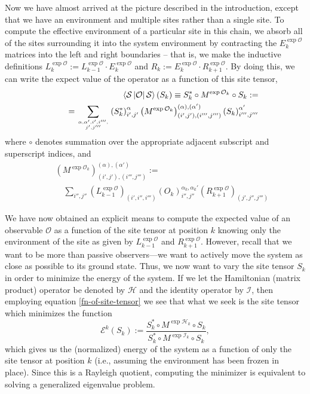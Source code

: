 \documentclass[12pt]{amsbook}
\theoremstyle{plain}
\theoremstyle{definition}
\theoremstyle{remark}
\newcommand{\coip}[3]{\left<#1\left|#2\right|#3\right>}
\newcommand{\paren}[1]{\left(#1\right)}
\newcommand{\mexp}[1]{\exp{\mathcal{#1}}}
\begin{document}
Now we have almost arrived at the picture described in the introduction, except that we have an environment and multiple sites rather than a single site.  To compute the effective environment of a particular site in this chain, we absorb all of the sites surrounding it into the system environment by contracting the $E_k^{\mexp{O}}$ matrices into the left and right boundaries -- that is, we make the inductive definitions $L_k^{\exp{\mathcal{O}}}:= L_{k-1}^{\exp{\mathcal{O}}}\cdot E_k^{\exp{\mathcal{O}}}$ and $R_k:=E_k^{\exp{\mathcal{O}}}\cdot R_{k+1}^{\exp{\mathcal{O}}}$.  By doing this, we can write the expect value of the operator as a function of this site tensor,  \begin{eqnarray}
\label{fn-of-site-tensor}
&&\coip{\mathcal{S}}{\mathcal{O}}{\mathcal{S}}(S_k) \equiv S_k^* \circ M^{\exp{\mathcal{O}}_k} \circ S_k :=  \\
&&\quad= \sum_{\genfrac{}{}{0pt}{}{\alpha,\alpha',i',i''',}{j',j'''}}\paren{S_k^*}^\alpha_{i',j'} \paren{M^{\exp{\mathcal{O}}_k}}^{(\alpha),(\alpha')}_{(i',j'),(i''',j''')}\paren{S_k}^{\alpha'}_{i''',j'''} \nonumber
\end{eqnarray}  where $\circ$ denotes summation over the appropriate adjacent subscript and superscript indices, and  \begin{eqnarray}
\label{m-matrix-definition}
&&\paren{M^{\exp{\mathcal{O}}_k}}^{(\alpha),(\alpha')}_{(i',j'),(i''',j''')} := \nonumber\\
&&\quad\sum_{i'',j''}\paren{L_{k-1}^{\exp{\mathcal{O}}}}_{(i',i'',i''')} \paren{O_k}^{\alpha_k,\alpha_k'}_{i'',j''} \paren{R_{k+1}^{\exp{\mathcal{O}}}}_{(j',j'',j''')} \nonumber
\end{eqnarray}

We have now obtained an explicit means to compute the expected value
of an observable $\mathcal{O}$ as a function of the site tensor at position $k$
knowing only the environment of the site as given by
$L^{\mexp{O}}_{k-1}$ and $R^{\mexp{O}}_{k+1}$.  However, recall that
we want to be more than passive observers---we want to actively move
the system as close as possible to its ground state.  Thus, we now
want to vary the site tensor $S_k$ in order to minimize the energy of
the system.  If we let the Hamiltonian (matrix product) operator be
denoted by $\mathcal{H}$ and the identity operator by $\mathcal{I}$, then employing equation \eqref{fn-of-site-tensor}
we see that what we seek is the site tensor which minimizes the function
$$\mathcal{E}^k(S_k) := \frac{S_k^*
  \circ M^{\exp{\mathcal{H}}_k} \circ S_k}{S_k^* \circ
  M^{\exp{\mathcal{I}}_k} \circ S_k},$$
which gives us the (normalized) energy of the system as a function of only the site tensor at position $k$ (i.e., assuming the environment has been frozen in place).  Since this is a Rayleigh quotient, computing the minimizer is equivalent to solving a generalized eigenvalue problem.
\end{document}
